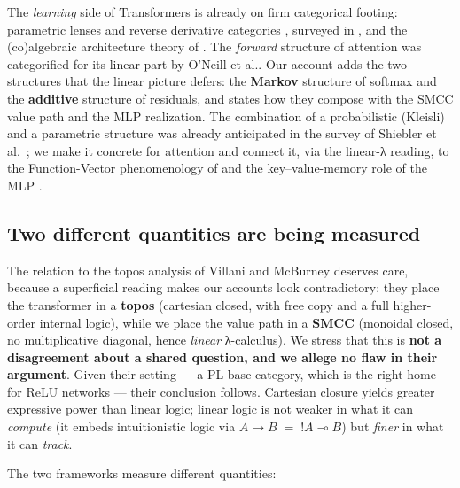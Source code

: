 \documentclass[a4paper,11pt]{article}
\begin{document}
The \emph{learning} side of Transformers is already on firm categorical footing: parametric lenses and reverse derivative categories
\cite{CRDC}\cite{fong2019backprop}\cite{cockett2020reverse,}, surveyed in \cite{shiebler2021category}, and the (co)algebraic architecture theory of \cite{gavranovic2024categorical}. The \emph{forward} structure of attention was categorified for its linear
part by O'Neill et al.\cite{oneill2025selfattentionparametricendofunctorcategorical}. Our account adds the two structures that the linear picture defers: the \textbf{Markov} structure of softmax \cite{Markov} and the \textbf{additive} structure of residuals, and
states how they compose with the SMCC value path and the MLP
realization. The combination of a probabilistic (Kleisli) and a parametric structure was already anticipated in the survey of Shiebler et al.~\cite{shiebler2021category}; we make it concrete for attention and connect it, via the linear-λ reading, to the Function-Vector phenomenology of \cite{FV} and the key--value-memory role of the MLP \cite{geva2021transformerfeedforwardlayerskeyvalue}.

\hypertarget{two-different-quantities-are-being-measured}{%
\subsection{Two different quantities are being measured}\label{two-different-quantities-are-being-measured}}

The relation to the topos analysis of Villani and McBurney \cite{Topos} deserves care, because a superficial reading makes our accounts look contradictory: they place the transformer in a \textbf{topos} (cartesian closed, with free copy and a full higher-order internal logic), while we
place the value path in a \textbf{SMCC} (monoidal closed, no multiplicative diagonal, hence \emph{linear} λ-calculus). We stress that
this is \textbf{not a disagreement about a shared question, and we allege no flaw in their argument}. Given their setting --- a PL base
category, which is the right home for ReLU networks --- their conclusion follows. Cartesian closure yields greater expressive power than linear
logic; linear logic is not weaker in what it can \emph{compute} (it embeds intuitionistic logic via \(A\to B \;=\; {!A}\multimap B\)) but
\emph{finer} in what it can \emph{track}.

The two frameworks measure different quantities:
\end{document}
